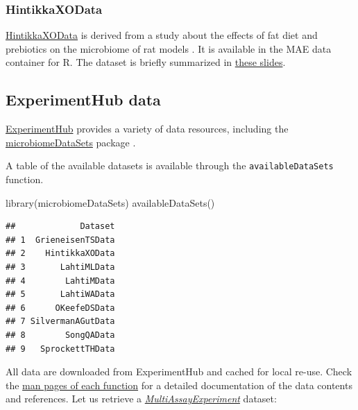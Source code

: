 \documentclass[
]{book}
\newenvironment{Shaded}{\begin{snugshade}}{\end{snugshade}}
\newcommand{\FunctionTok}[1]{\textcolor[rgb]{0.00,0.00,0.00}{#1}}
\newcommand{\NormalTok}[1]{#1}
\begin{document}
\hypertarget{hintikka-desc}{%
\subsubsection{HintikkaXOData}\label{hintikka-desc}}

\href{https://microbiome.github.io/microbiomeDataSets/reference/HintikkaXOData.html}{HintikkaXOData}
is derived from a study about the effects of fat diet and prebiotics on the
microbiome of rat models \citep{Hintikka2021}. It is available in the MAE data
container for R. The dataset is briefly summarized in
\href{https://microbiome.github.io/outreach/hintikkaxo_presentation.html}{these slides}.

\hypertarget{experimenthub-data}{%
\subsection{ExperimentHub data}\label{experimenthub-data}}

\href{https://bioconductor.org/packages/release/bioc/vignettes/ExperimentHub/inst/doc/ExperimentHub.html}{ExperimentHub}
provides a variety of data resources, including the
\href{https://bioconductor.org/packages/release/data/experiment/html/microbiomeDataSets.html}{microbiomeDataSets}
package \citep{Morgan2021, microlahti2021}.

A table of the available datasets is available through the
\texttt{availableDataSets} function.

\begin{Shaded}
\begin{Highlighting}[]
\FunctionTok{library}\NormalTok{(microbiomeDataSets)}
\FunctionTok{availableDataSets}\NormalTok{()}
\end{Highlighting}
\end{Shaded}

\begin{verbatim}
##             Dataset
## 1  GrieneisenTSData
## 2    HintikkaXOData
## 3       LahtiMLData
## 4        LahtiMData
## 5       LahtiWAData
## 6      OKeefeDSData
## 7 SilvermanAGutData
## 8        SongQAData
## 9   SprockettTHData
\end{verbatim}

All data are downloaded from ExperimentHub and cached for local
re-use. Check the \href{https://microbiome.github.io/microbiomeDataSets/reference/index.html}{man pages of each
function}
for a detailed documentation of the data contents and references. Let
us retrieve a \emph{\href{https://bioconductor.org/packages/3.17/MultiAssayExperiment}{MultiAssayExperiment}} dataset:
\end{document}
